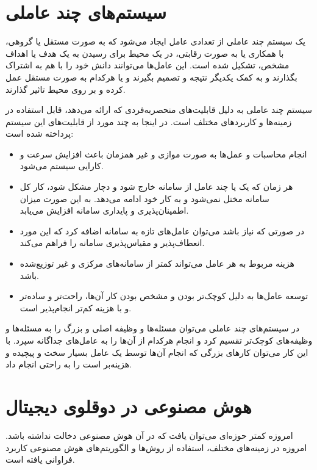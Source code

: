 \section{سیستم‌های چند ‌عاملی}
یک سیستم چند عاملی از تعدادی عامل ایجاد می‌شود که به صورت مستقل یا گروهی، با همکاری یا به صورت رقابتی، در یک محیط برای رسیدن به یک هدف یا اهداف مشخص، تشکیل شده است. این عامل‌ها می‌توانند دانش خود را با هم به اشتراک بگذارند و به کمک یکدیگر نتیجه و تصمیم بگیرند و یا هرکدام به صورت مستقل عمل کرده و بر روی محیط تاثیر گذارند.

سیستم‌ چند عاملی به دلیل قابلیت‌های منحصربه‌فردی که ارائه می‌دهد، قابل استفاده در زمینه‌ها و کاربرد‌های مختلف است. در اینجا به چند مورد از قابلیت‌های این سیستم ‌پرداخته‌ شده است:
\cite{b5}

\begin{itemize}
	\item
	انجام محاسبات و عمل‌ها به صورت موازی و غیر همزمان باعث افزایش سرعت و کارایی سیستم می‌شود.
	\item 
	هر زمان که یک یا چند عامل از سامانه خارج شود و دچار مشکل شود، کار کل سامانه مختل نمی‌شود و به کار خود ادامه می‌دهد. به این صورت میزان اطمینان‌پذیری و پایداری سامانه افزایش می‌یابد.
	
	\item
	در صورتی که نیاز باشد می‌توان عامل‌های تازه به سامانه اضافه کرد که این مورد انعطاف‌پذیر و مقیاس‌پذیری سامانه را فراهم می‌کند.
	
	\item 
	هزینه مربوط به هر عامل می‌تواند کمتر از سامانه‌های مرکزی و غیر توزیع‌شده باشد.
	\item 
	توسعه عامل‌ها به دلیل کوچک‌تر بودن و مشخص بودن کار آن‌ها، راحت‌تر و ساده‌تر و با هزینه کم‌تر انجام‌پذیر است.
	
\end{itemize}

در سیستم‌‌های چند عاملی می‌توان مسئله‌ها و وظیفه اصلی و بزرگ را به مسئله‌ها و وظیفه‌های کوچک‌تر تقسیم کرد و انجام هرکدام از آن‌ها را به عامل‌های جداگانه سپرد. با این کار می‌توان کار‌های بزرگی که انجام آن‌ها توسط یک عامل بسیار سخت و پیچیده  و هزینه‌بر است را به راحتی انجام داد.
\cite{b6}

\section{هوش مصنوعی در دوقلو‌ی دیجیتال}

امروزه کمتر حوزه‌ای می‌توان یافت که در آن هوش مصنوعی دخالت نداشته‌ باشد. امروزه در زمینه‌های مختلف، استفاده از روش‌ها و الگوریتم‌های هوش مصنوعی کاربرد فراوانی یافته است. 

